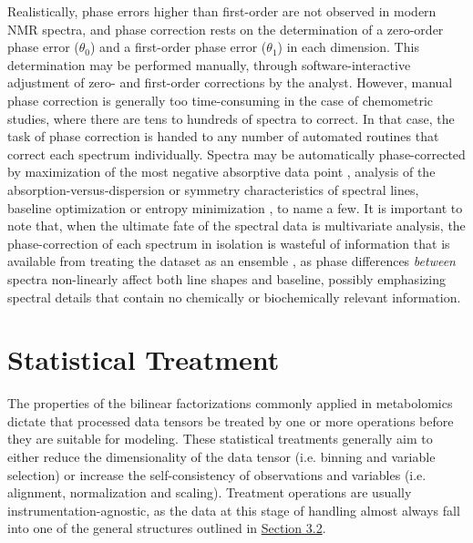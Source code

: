 \begin{doublespace}
Realistically, phase errors higher than first-order are not observed in modern
NMR spectra, and phase correction rests on the determination of a zero-order
phase error ($\theta_0$) and a first-order phase error ($\theta_1$) in each
dimension. This determination may be performed manually, through
software-interactive adjustment of zero- and first-order corrections by the
analyst. However, manual phase correction is generally too time-consuming in
the case of chemometric studies, where there are tens to hundreds of spectra
to correct. In that case, the task of phase correction is handed to any number
of automated routines that correct each spectrum individually. Spectra may be
automatically phase-corrected by maximization of the most negative absorptive
data point \cite{siegel:aca1981}, analysis of the absorption-versus-dispersion
\cite{craig:jmr1988} or symmetry \cite{heuer:jmr1991} characteristics of
spectral lines, baseline optimization \cite{brown:jmr1989} or entropy
minimization \cite{chen:jmr2002}, to name a few. It is important to note that,
when the ultimate fate of the spectral data is multivariate analysis, the
phase-correction of each spectrum in isolation is wasteful of information that
is available from treating the dataset as an ensemble \cite{worley:cils2014},
as phase differences {\it between} spectra non-linearly affect both line shapes
and baseline, possibly emphasizing spectral details that contain no
chemically or biochemically relevant information.
\end{doublespace}

\section{Statistical Treatment}

\begin{doublespace}
The properties of the bilinear factorizations commonly applied in metabolomics
dictate that processed data tensors be treated by one or more operations before
they are suitable for modeling. These statistical treatments generally aim to
either reduce the dimensionality of the data tensor (i.e. binning and variable
selection) or increase the self-consistency of observations and variables
(i.e. alignment, normalization and scaling). Treatment operations are usually
instrumentation-agnostic, as the data at this stage of handling almost always
fall into one of the general structures outlined in
\hyperlink{section.3.2}{Section 3.2}.
\end{doublespace}

